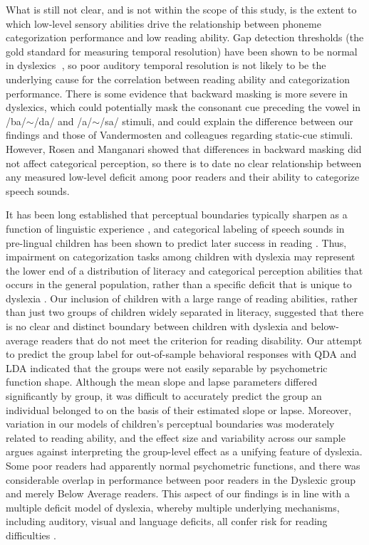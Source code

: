 \documentclass[../uwthesis.tex]{subfiles}
\begin{document}
What is still not clear, and is not within the scope of this study, is the extent to which low-level sensory abilities drive the relationship between phoneme categorization performance and low reading ability. Gap detection thresholds (the gold standard for measuring temporal resolution) have been shown to be normal in dyslexics \cite{Adlard1998SpeechDyslexia,Boets2007AuditoryTheory,McAnally1997ScalpDyslexia.,Schulte-Korne1998RoleDisability}, so poor auditory temporal resolution is not likely to be the underlying cause for the correlation between reading ability and categorization performance. There is some evidence that backward masking is more severe in dyslexics\cite{Wright1997DeficitsChildren}, which could potentially mask the consonant cue preceding the vowel in /ba/$\sim$/da/ and /a/$\sim$/sa/ stimuli, and could explain the difference between our findings and those of Vandermosten and colleagues regarding static-cue stimuli. However, Rosen and Manganari \cite{Rosen2001Speech} showed that differences in backward masking did not affect categorical perception, so there is to date no clear relationship between any measured low-level deficit among poor readers and their ability to categorize speech sounds. 

It has been long established that perceptual boundaries typically sharpen as a function of linguistic experience \cite{Garnica1973ThePerception}, and categorical labeling of speech sounds in pre-lingual children has been shown to predict later success in reading \cite{Bradley1983CategorizingConnection}. Thus, impairment on categorization tasks among children with dyslexia may represent the lower end of a distribution of literacy and categorical perception abilities that occurs in the general population, rather than a specific deficit that is unique to dyslexia \cite{Shaywitz1992EvidenceAbility}. Our inclusion of children with a large range of reading abilities, rather than just two groups of children widely separated in literacy, suggested that there is no clear and distinct boundary between children with dyslexia and below-average readers that do not meet the criterion for reading disability. Our attempt to predict the group label for out-of-sample behavioral responses with QDA and LDA indicated that the groups were not easily separable by psychometric function shape. Although the mean slope and lapse parameters differed significantly by group, it was difficult to accurately predict the group an individual belonged to on the basis of their estimated slope or lapse. Moreover, variation in our models of children’s perceptual boundaries was moderately related to reading ability, and the effect size and variability across our sample argues against interpreting the group-level effect as a unifying feature of dyslexia. Some poor readers had apparently normal psychometric functions, and there was considerable overlap in performance between poor readers in the Dyslexic group and merely Below Average readers.  This aspect of our findings is in line with a multiple deficit model of dyslexia, whereby multiple underlying mechanisms, including auditory, visual and language deficits, all confer risk for reading difficulties \cite{Joo2017TheReconsidered,Joo2017OptimizingDifficulties,Pennington2006FromDisorders,Peterson2015DevelopmentalDyslexia}.
\end{document}

